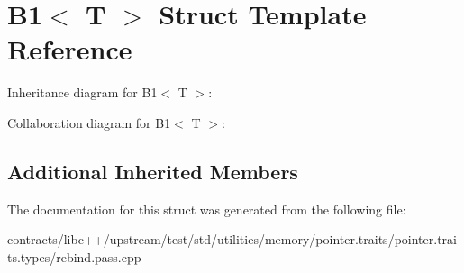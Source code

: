 \hypertarget{struct_b1}{}\section{B1$<$ T $>$ Struct Template Reference}
\label{struct_b1}


Inheritance diagram for B1$<$ T $>$\+:


Collaboration diagram for B1$<$ T $>$\+:
\subsection*{Additional Inherited Members}


The documentation for this struct was generated from the following file\+:\begin{DoxyCompactItemize}
\item 
contracts/libc++/upstream/test/std/utilities/memory/pointer.\+traits/pointer.\+traits.\+types/rebind.\+pass.\+cpp\end{DoxyCompactItemize}
